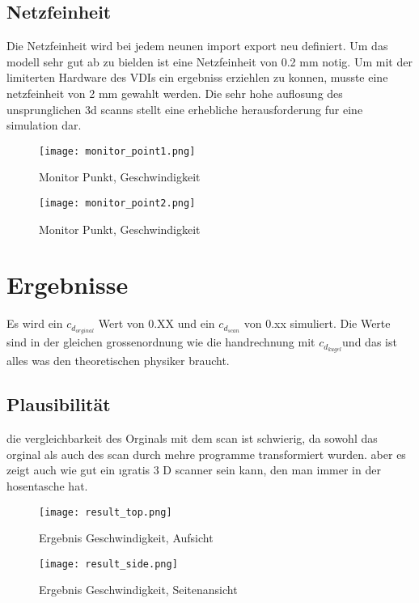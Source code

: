 \documentclass[a4paper,12pt]{article}
\begin{document}
\subsection{Netzfeinheit}
Die Netzfeinheit wird bei jedem neunen import export neu definiert. Um das modell sehr gut ab zu bielden ist eine Netzfeinheit von 0.2 mm notig. Um mit der limiterten Hardware des VDIs ein ergebniss erziehlen zu konnen, musste eine netzfeinheit von 2 mm gewahlt werden. Die sehr hohe auflosung des unsprunglichen 3d scanns stellt eine erhebliche herausforderung fur eine simulation dar.

\begin{figure}[h]
    \centering
    \texttt{[image: monitor\_point1.png]}
    \caption{Monitor Punkt, Geschwindigkeit}
    \label{fig:monitor1}
\end{figure}



\begin{figure}[h]
    \centering
    \texttt{[image: monitor\_point2.png]}
    \caption{Monitor Punkt, Geschwindigkeit}
    \label{fig:monitor2}
\end{figure}

\section{Ergebnisse}
Es wird ein  \( c_d_{orginal} \) Wert von 0.XX und ein  \( c_d_{scan} \) von 0.xx simuliert. Die Werte sind in der gleichen grossenordnung wie die handrechnung  mit  \( c_d_{kugel} \)und das ist alles was den theoretischen physiker braucht.

\subsection{Plausibilität}
die vergleichbarkeit des Orginals mit dem scan ist schwierig, da sowohl das orginal als auch des scan durch mehre programme transformiert wurden. aber es zeigt auch wie gut ein \i{gratis} 3 D scanner sein kann, den man immer in der hosentasche hat.

\begin{figure}[h]
    \centering
    \texttt{[image: result\_top.png]}
    \caption{Ergebnis Geschwindigkeit, Aufsicht}
    \label{fig:result_top}
\end{figure}


\begin{figure}[h]
    \centering
    \texttt{[image: result\_side.png]}
    \caption{Ergebnis Geschwindigkeit, Seitenansicht}
    \label{fig:result_side}
\end{figure}
\end{document}
